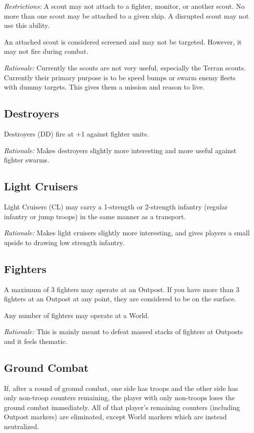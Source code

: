\textit{Restrictions:} A scout may not attach to a fighter, monitor, or another scout. No more than one scout may be attached to a given ship. A disrupted scout may not use this ability.

An attached scout is considered screened and may not be targeted. However, it may not fire during combat.

\textit{Rationale:} Currently the scouts are not very useful, especially the Terran scouts. Currently their primary purpose is to be speed bumps or swarm enemy fleets with dummy targets. This gives them a mission and reason to live.

\subsection{Destroyers}

Destroyers (DD) fire at +1 against fighter units.

\textit{Rationale:} Makes destroyers slightly more interesting and more useful against fighter swarms.

\subsection{Light Cruisers}

Light Cruisers (CL) may carry a 1-strength or 2-strength infantry (regular infantry or jump troops) in the same manner as a transport.

\textit{Rationale:} Makes light cruisers slightly more interesting, and gives players a small upside to drawing low strength infantry.

\subsection{Fighters}

A maximum of 3 fighters may operate at an Outpost. If you have more than 3 fighters at an Outpost at any point, they are considered to be on the surface.

Any number of fighters may operate at a World.

\textit{Rationale:} This is mainly meant to defeat massed stacks of fighters at Outposts and it feels thematic.

\subsection{Ground Combat}

If, after a round of ground combat, one side has troops and the other side has only non-troop counters remaining, the player with only non-troops loses the ground combat immediately. All of that player's remaining counters (including Outpost markers) are eliminated, except World markers which are instead neutralized.

